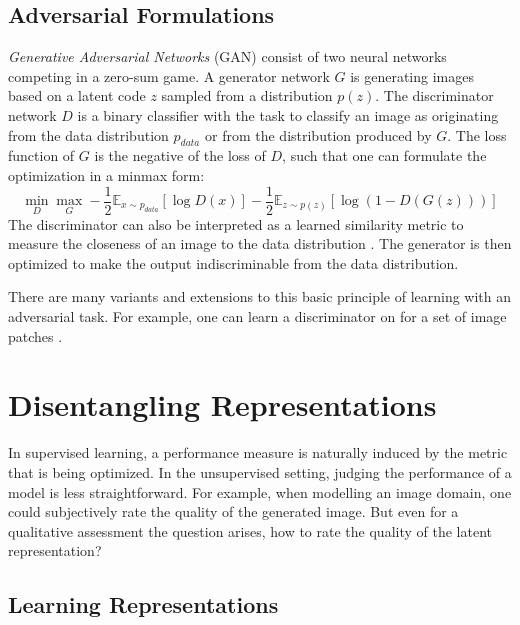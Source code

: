 	\subsection{Adversarial Formulations}\label{sec:adversarial}
		\textit{Generative Adversarial Networks} (GAN) \cite{goodfellow14gan} consist of two neural networks competing in a zero-sum game. A generator network $G$ is generating images based on a latent code $z$ sampled from a distribution $p(z)$. The discriminator network $D$ is a binary classifier with the task to classify an image as originating from the data distribution $p_{data}$ or from the distribution produced by $G$. The loss function of $G$ is the negative of the loss of $D$, such that one can formulate the optimization in a minmax form:
		\begin{equation}
				\min_D \max_G - \frac{1}{2} \mathds{E}_{x\sim p_{data}}[\log D(x)] - \frac{1}{2}\mathds{E}_{z\sim p(z)}[\log (1-D(G(z)))]
		\end{equation}
		The discriminator can also be interpreted as a learned similarity metric to measure the closeness of an image to the data distribution \cite{larsen15vaegan}. The generator is then optimized to make the output indiscriminable from the data distribution.

		There are many variants and extensions to this basic principle of learning with an adversarial task. For example, one can learn a discriminator on for a set of image patches \cite{isola17image2image}. 

\section{Disentangling Representations}\label{sec:disentangled}
	In supervised learning, a performance measure is naturally induced by the metric that is being optimized. In the unsupervised setting, judging the performance of a model is less straightforward. For example, when modelling an image domain, one could subjectively rate the quality of the generated image. But even for a qualitative assessment the question arises, how to rate the quality of the latent representation?

	\subsection{Learning Representations}

